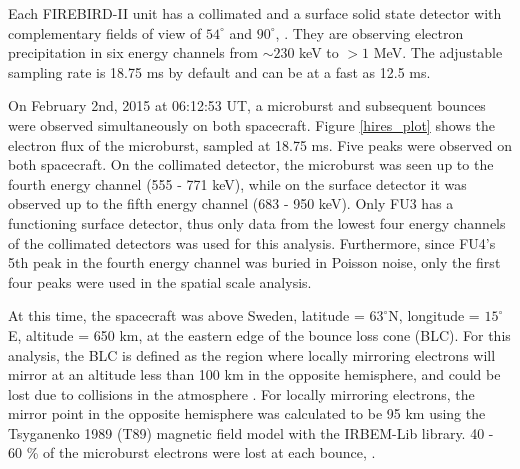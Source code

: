\documentclass[draft, linenumbers]{agujournal}
\begin{document}
Each FIREBIRD-II unit has a collimated and a surface solid state detector with complementary fields of view of $54^{\circ}$ and $90^{\circ}$, . They are observing electron precipitation in six energy channels from $\sim 230$ keV to $> 1$ MeV. The adjustable sampling rate is 18.75 ms by default and can be at a fast as 12.5 ms. 

On February 2nd, 2015 at 06:12:53 UT, a microburst and subsequent bounces were observed simultaneously on both spacecraft. Figure \ref{hires_plot} shows the  electron flux of the microburst, sampled at 18.75 ms. Five peaks were observed on both spacecraft. On the collimated detector, the microburst was seen up to the fourth energy channel (555 - 771 keV), while on the surface detector it was observed up to the fifth energy channel (683 - 950 keV). Only FU3 has a functioning surface detector, thus only data from the lowest four energy channels of the collimated detectors was used for this analysis. Furthermore, since FU4's 5th peak in the fourth energy channel was buried in Poisson noise, only the first four peaks were used in the spatial scale analysis.

 At this time, the spacecraft was above Sweden, latitude = $63^{\circ}$N, longitude = $15^{\circ}$E, altitude = 650 km, at the eastern edge of the bounce loss cone (BLC). For this analysis, the BLC is defined as the region where locally mirroring electrons will mirror at an altitude less than 100 km in the opposite hemisphere, and could be lost due to collisions in the atmosphere \citep{Abel1998_1}.  For locally mirroring electrons, the mirror point in the opposite hemisphere was calculated to be 95 km using the Tsyganenko 1989 (T89) magnetic field model \citep{Tsyganenko1989} with the IRBEM-Lib library.   40 - 60 \% of the microburst electrons were lost at each bounce, . 
\end{document}
